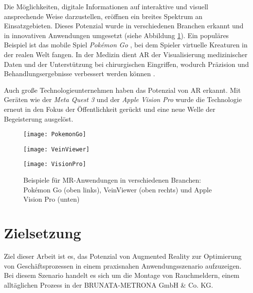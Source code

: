 Die Möglichkeiten, digitale Informationen auf interaktive und visuell ansprechende Weise darzustellen, eröffnen ein breites Spektrum an Einsatzgebieten. Dieses Potenzial wurde in verschiedenen Branchen erkannt und in innovativen Anwendungen umgesetzt (siehe Abbildung \ref{fig:MRApplications}). Ein populäres Beispiel ist das mobile Spiel \textit{Pokémon Go} \cite{wikipedia2024pokemonGo}, bei dem Spieler virtuelle Kreaturen in der realen Welt fangen. In der Medizin dient AR der Visualisierung medizinischer Daten und der Unterstützung bei chirurgischen Eingriffen, wodurch Präzision und Behandlungsergebnisse verbessert werden können \cite{chen2017medicalMR}.

Auch große Technologieunternehmen haben das Potenzial von AR erkannt. Mit Geräten wie der \textit{Meta Quest 3} \cite{meta2024quest} und der \textit{Apple Vision Pro} \cite{apple2023visionPro} wurde die Technologie erneut in den Fokus der Öffentlichkeit gerückt und eine neue Welle der Begeisterung ausgelöst.

\begin{figure}[h]
    \centering
    \begin{minipage}{0.45\textwidth}
        \centering
        \texttt{[image: PokemonGo]}
    \end{minipage}
    \begin{minipage}{0.45\textwidth}
        \centering
        \texttt{[image: VeinViewer]}
    \end{minipage}
    \begin{minipage}{0.45\textwidth}
        \centering
        \texttt{[image: VisionPro]}
    \end{minipage}
    \caption{Beispiele für MR-Anwendungen in verschiedenen Branchen: Pokémon Go (oben links), VeinViewer (oben rechts) und Apple Vision Pro (unten) \cite{niantic2025pokemongo, chen2017medicalMR, apple2023visionPro}}
    \label{fig:MRApplications}
\end{figure}

\section{Zielsetzung}

Ziel dieser Arbeit ist es, das Potenzial von Augmented Reality zur Optimierung von Geschäftsprozessen in einem praxisnahen Anwendungsszenario aufzuzeigen. Bei diesem Szenario handelt es sich um die Montage von Rauchmeldern, einem alltäglichen Prozess in der BRUNATA-METRONA GmbH \& Co. KG.

